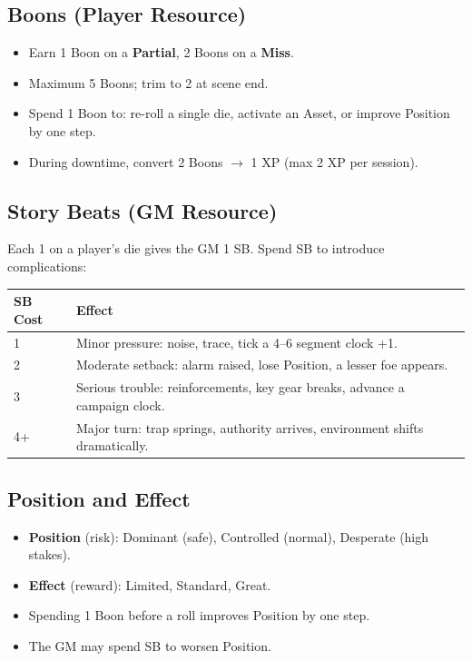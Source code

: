 \subsection*{Boons (Player Resource)}

\begin{itemize}
  \item Earn 1 Boon on a \textbf{Partial}, 2 Boons on a \textbf{Miss}.
  \item Maximum 5 Boons; trim to 2 at scene end.
  \item Spend 1 Boon to: re-roll a single die, activate an Asset, or improve Position by one step.
  \item During downtime, convert 2 Boons $\rightarrow$ 1 XP (max 2 XP per session).
\end{itemize}

\subsection*{Story Beats (GM Resource)}

Each 1 on a player's die gives the GM 1 SB. Spend SB to introduce complications:

\begin{tabular}{@{}ll@{}}
\toprule
\textbf{SB Cost} & \textbf{Effect} \\
\midrule
1 & Minor pressure: noise, trace, tick a 4–6 segment clock +1. \\
2 & Moderate setback: alarm raised, lose Position, a lesser foe appears. \\
3 & Serious trouble: reinforcements, key gear breaks, advance a campaign clock. \\
4+ & Major turn: trap springs, authority arrives, environment shifts dramatically. \\
\bottomrule
\end{tabular}

\subsection*{Position and Effect}

\begin{itemize}
  \item \textbf{Position} (risk): Dominant (safe), Controlled (normal), Desperate (high stakes).
  \item \textbf{Effect} (reward): Limited, Standard, Great.
  \item Spending 1 Boon before a roll improves Position by one step.
  \item The GM may spend SB to worsen Position.
\end{itemize}


